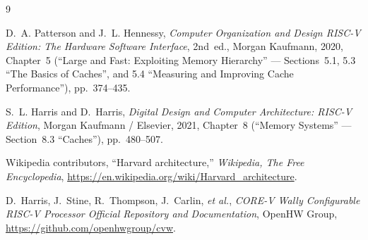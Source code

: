 \documentclass[11pt,a4paper]{article}
\begin{document}

\vspace{0.2em}
\begin{thebibliography}{9}
\small
\setlength{\itemsep}{3pt}

D.~A. Patterson and J.~L. Hennessy, \emph{Computer Organization and Design RISC-V Edition: The Hardware Software Interface}, 2nd~ed., Morgan Kaufmann, 2020, Chapter~5 (``Large and Fast: Exploiting Memory Hierarchy'' --- Sections~5.1, 5.3 ``The Basics of Caches'', and 5.4 ``Measuring and Improving Cache Performance''), pp.~374--435.

S.~L. Harris and D.~Harris, \emph{Digital Design and Computer Architecture: RISC-V Edition}, Morgan Kaufmann / Elsevier, 2021, Chapter~8 (``Memory Systems'' --- Section~8.3 ``Caches''), pp.~480--507.

Wikipedia contributors, ``Harvard architecture,'' \emph{Wikipedia, The Free Encyclopedia}, \url{https://en.wikipedia.org/wiki/Harvard_architecture}.

D.~Harris, J.~Stine, R.~Thompson, J.~Carlin, \emph{et al.}, \emph{CORE-V Wally Configurable RISC-V Processor Official Repository and Documentation}, OpenHW Group, \url{https://github.com/openhwgroup/cvw}.

\end{thebibliography}
\end{document}
